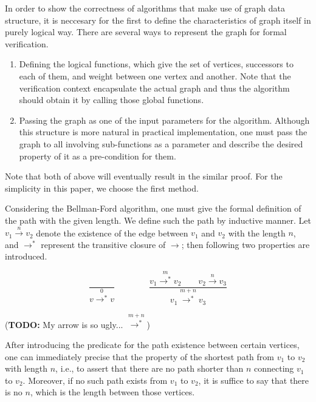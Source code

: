 \documentclass[a4paper,12pt]{article}
\begin{document}
In order to show the correctness of algorithms that make use of graph data structure, it is neccesary for the first to define the characteristics of graph itself in purely logical way. There are several ways to represent the graph for formal verification.

\begin{enumerate}

\item Defining the logical functions, which give the set of vertices, successors to each of them, and weight between one vertex and another. Note that the verification context encapsulate the actual graph and thus the algorithm should obtain it by calling those global functions.

\item Passing the graph as one of the input parameters for the algorithm. Although this structure is more natural in practical implementation, one must pass the graph to all involving sub-functions as a parameter and describe the desired property of it as a pre-condition for them.

\end{enumerate}

Note that both of above will eventually result in the similar proof. For the simplicity in this paper, we choose the first method.

Considering the Bellman-Ford algorithm, one must give the formal definition of the path with the given length. We define such the path by inductive manner. Let $ v_1 \stackrel{n}{\to} v_2 $ denote the existence of the edge between $ v_1 $ and $ v_2 $ with the length $ n $, and $ \to ^* $ represent the transitive closure of $ \to $; then following two properties are introduced.

\begin{displaymath}
  \frac{}
       {v{\stackrel{0}{\to^*}} v}
  \qquad\qquad
  \frac{v_1\stackrel{m}{\to^*}v_2 \qquad v_2\stackrel{n}{\to}v_3}
       {v_1\stackrel{m+n}{\longrightarrow^*}v_3}
\end{displaymath}

(\textbf{TODO:} My arrow is so ugly... $ \stackrel{m+n}{\longrightarrow^*} $)

After introducing the predicate for the path existence between certain vertices, one can immediately precise that the property of the shortest path from $ v_1 $ to $ v_2 $ with length $ n $, i.e., to assert that there are no path shorter than $ n $ connecting $ v_1 $ to $ v_2 $. Moreover, if no such path exists from $ v_1 $ to $ v_2 $, it is suffice to say that there is no $ n $, which is the length between those vertices.
\end{document}
